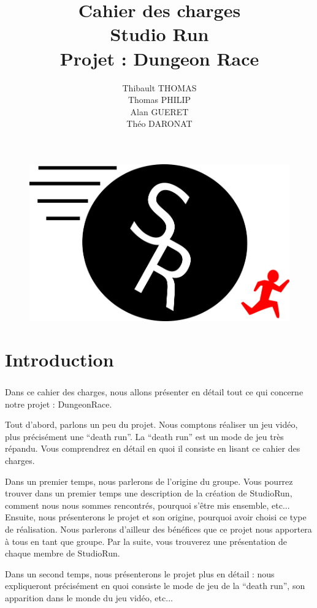 \documentclass[12pt]{report}
\title{\huge Cahier des charges \\ \LARGE Studio Run\\ \large Projet : Dungeon Race}
\date{}
\author{\small Thibault THOMAS \\ \small Thomas PHILIP \\ \small Alan GUERET \\ \small Théo DARONAT}
\begin{document}
\begin{figure}
\centering\includegraphics[scale=0.3]{logo2_final.png} 
\maketitle
\end{figure}
\tableofcontents

\pagebreak
\chapter{Introduction}
\paragraph{}
	Dans ce cahier des charges, nous allons présenter en détail tout ce qui concerne notre projet : DungeonRace.

	Tout d’abord, parlons un peu du projet. Nous comptons réaliser un jeu vidéo, plus précisément une “death run”. La “death run” est un mode de jeu très répandu. Vous comprendrez en détail en quoi il consiste en lisant ce cahier des charges. 

	Dans un premier temps, nous parlerons de l’origine du groupe. Vous pourrez trouver dans un premier temps une description de la création de StudioRun, comment nous nous sommes rencontrés, pourquoi s’être mis ensemble, etc... Ensuite, nous présenterons le projet et son origine, pourquoi avoir choisi ce type de réalisation. Nous parlerons d’ailleur des bénéfices que ce projet nous apportera à tous en tant que groupe. Par la suite, vous trouverez une présentation de chaque membre de StudioRun. 
	
	Dans un second temps, nous présenterons le projet plus en détail : nous expliqueront précisément en quoi consiste le mode de jeu de la “death run”, son apparition dans le monde du jeu vidéo, etc...
	
\end{document}
